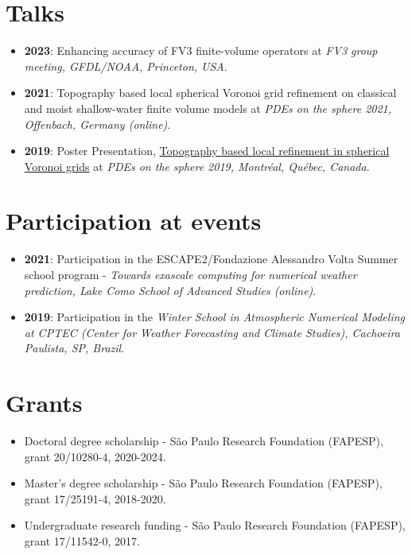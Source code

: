 \documentclass[letterpaper,11pt]{article}
\begin{document}
\section{Talks}
\begin{itemize}
	\item \textbf{2023}: {Enhancing accuracy of FV3 finite-volume operators} at \textit{FV3 group meeting, 
	GFDL/NOAA, Princeton, USA}.
	\item \textbf{2021}: {Topography based local spherical Voronoi grid refinement on classical and moist shallow-water finite volume models} at \textit{PDEs on the sphere 2021, Offenbach, Germany (online)}.
	\item \textbf{2019}: Poster Presentation, \href{https://collaboration.cmc.ec.gc.ca/science/pdes-2019/pdfs/poster-Luan-Santos.pdf}{Topography based local refinement in spherical Voronoi grids} at \textit{PDEs on the sphere 2019, Montréal, Québec, Canada}.
\end{itemize}


\section{Participation at events}
\begin{itemize}
	\item \textbf{2021}: Participation in the
	ESCAPE2/Fondazione Alessandro Volta  Summer school program -
	\textit{Towards exascale computing
		for numerical weather prediction, Lake Como School of Advanced Studies (online)}.
	\item \textbf{2019}: Participation in the \textit{Winter School in Atmospheric Numerical Modeling at CPTEC (Center for Weather Forecasting and Climate Studies), Cachoeira Paulista, SP, Brazil}.
\end{itemize}


%
\section{Grants}
\begin{itemize}
	\item Doctoral degree scholarship  - São Paulo Research Foundation (FAPESP),  grant 20/10280-4, 2020-2024.		
	\item Master's degree scholarship   - São Paulo Research Foundation (FAPESP),  grant 17/25191-4, 2018-2020.
	\item Undergraduate research funding  - São Paulo Research Foundation (FAPESP), grant 17/11542-0, 2017.
\end{itemize}
\end{document}
